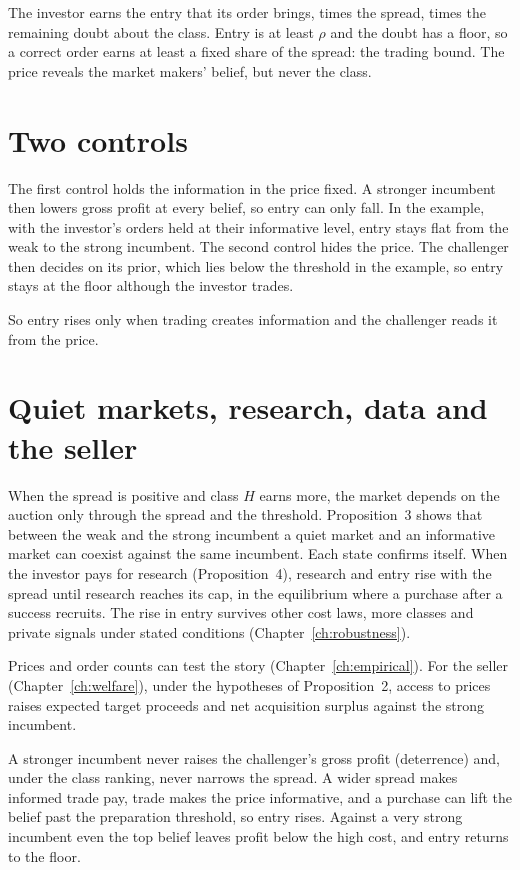 The investor earns the entry that its order brings, times the spread, times the remaining doubt about the class. Entry is at least \(\rho\) and the doubt has a floor, so a correct order earns at least a fixed share of the spread: the trading bound. The price reveals the market makers' belief, but never the class.

\section{Two controls}\label{sec:story-controls}

The first control holds the information in the price fixed. A stronger incumbent then lowers gross profit at every
belief, so entry can only fall. In the example, with the investor's orders held at their informative level, entry
stays flat from the weak to the strong incumbent. The second control hides
the price. The challenger then decides on its prior, which lies below the threshold in the example, so entry stays
at the floor although the investor trades.

So entry rises only when trading creates information and the challenger reads it from the price.

\section{Quiet markets, research, data and the seller}\label{sec:story-markets}

When the spread is positive and class \(H\) earns more, the market depends on the auction only through the spread and the threshold. Proposition~3 shows that between the weak and the strong incumbent a quiet market and an informative market can coexist against the same incumbent. Each state
confirms itself. When the investor pays for research (Proposition~4), research and entry rise with the spread until research reaches its cap, in the equilibrium where a purchase after a success recruits. The rise in entry survives
other cost laws, more classes and private signals under stated conditions (Chapter~\ref{ch:robustness}).

Prices and order counts can test the story (Chapter~\ref{ch:empirical}). For the seller (Chapter~\ref{ch:welfare}), under the hypotheses of Proposition~2, access to prices raises
expected target proceeds and net acquisition surplus against the strong incumbent. 
\begin{chaptersummary}
A stronger incumbent never raises the challenger's gross profit (deterrence) and, under the class ranking, never narrows the spread. A wider spread makes informed trade pay, trade makes the price
informative, and a purchase can lift the belief past the preparation threshold, so entry rises. Against a very
strong incumbent even the top belief leaves profit below the high cost, and entry returns to the floor.
\end{chaptersummary}

